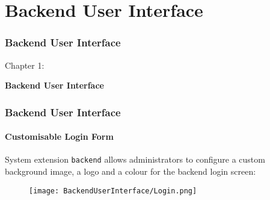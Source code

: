 %

\section{Backend User Interface}
\begin{frame}[fragile]
	\frametitle{Backend User Interface}

	\begin{center}\huge{Chapter 1:}\end{center}
	\begin{center}\huge{\color{typo3darkgrey}\textbf{Backend User Interface}}\end{center}

\end{frame}

\begin{frame}[fragile]
	\frametitle{Backend User Interface}
	\framesubtitle{Customisable Login Form}

	System extension \texttt{backend} allows administrators to configure a custom
	background image, a logo and a colour for the backend login screen:

	\begin{figure}
		\texttt{[image: BackendUserInterface/Login.png]}
	\end{figure}

\end{frame}

